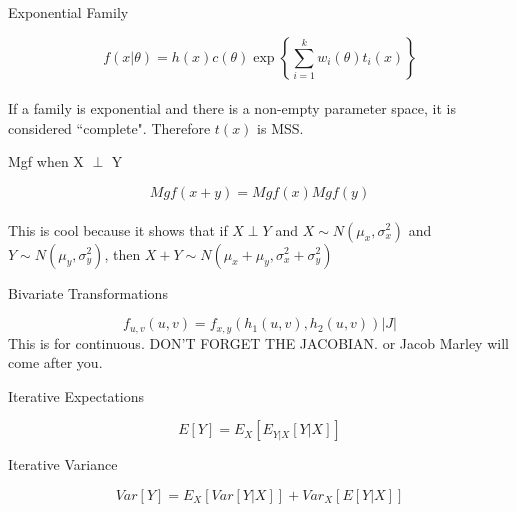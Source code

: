 \documentclass[avery5388,grid,frame]{flashcards}
\begin{document}
\begin{flashcard}[Form]{Exponential Family}
\begin{center}
\bigskip\bigskip\bigskip
\begin{equation*}
f(x|\theta)=h(x)c(\theta)\exp\left\{\sum_{i=1}^kw_i(\theta)t_i(x)\right\}
\end{equation*}
\bigskip\\
If a family is exponential and there is a non-empty parameter space, it is considered ``complete". Therefore $t(x)$ is MSS.
\end{center}
\end{flashcard}
\begin{flashcard}{Mgf when X $\perp$ Y }
\begin{center}
\bigskip\bigskip\bigskip
\begin{equation*}
Mgf(x+y)=Mgf(x)Mgf(y)
\end{equation*}
\bigskip\\
This is cool because it shows that if $X\perp Y$ and $X\sim N(\mu_x, \sigma_x^2)$ and $Y\sim N(\mu_y,\sigma_y^2)$, then $X+Y\sim N(\mu_x+\mu_y,\sigma_x^2+\sigma_y^2)$
\end{center}
\end{flashcard}
\begin{flashcard}[Equation]{Bivariate Transformations}
\begin{center}
\bigskip\bigskip\bigskip
\begin{equation*}
f_{u,v}(u,v)=f_{x,y}(h_1(u,v),h_2(u,v))|J|
\end{equation*}
\bigskip
This is for continuous. DON'T FORGET THE JACOBIAN. or Jacob Marley will come after you.
\end{center}
\end{flashcard}
\begin{flashcard}[Equation]{Iterative Expectations}
\begin{center}
\bigskip\bigskip\bigskip
\begin{equation*}
E[Y]=E_X[E_{Y|X}[Y|X]]
\end{equation*} 
\end{center}
\end{flashcard}
\begin{flashcard}[Equation]{Iterative Variance}
\begin{center}
\bigskip\bigskip\bigskip
\begin{equation*}
Var[Y]=E_X[Var[Y|X]]+Var_X[E[Y|X]]
\end{equation*}
\end{center}
\end{flashcard}
\end{document}

